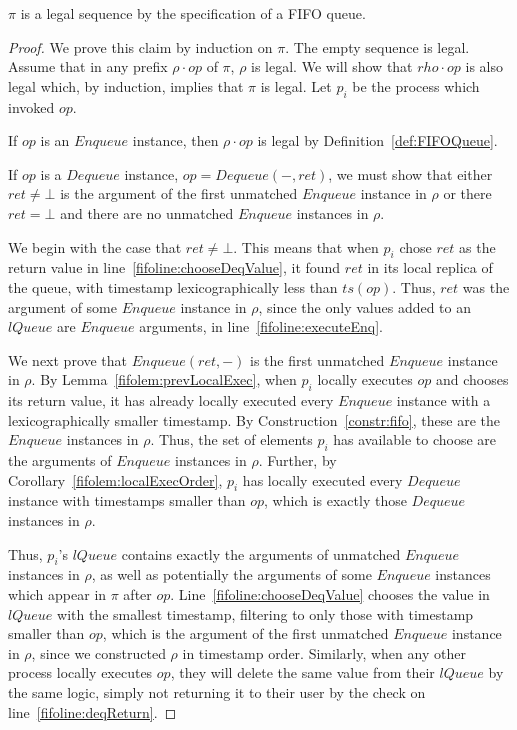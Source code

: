 \documentclass[a4paper,anonymous,USenglish]{lipics-v2021} %
\theoremstyle{definition}
\begin{document}
\begin{lemma}\label{fifolem:legal}
  $\pi$ is a legal sequence by the specification of a FIFO queue.
\end{lemma}

\begin{proof}
  We prove this claim by induction on $\pi$.  The empty sequence is legal.  Assume that in any prefix $\rho \cdot op$ of $\pi$, $\rho$ is legal.  We will show that $rho \cdot op$ is also legal which, by induction, implies that $\pi$ is legal.  Let $p_i$ be the process which invoked $op$.

  If $op$ is an $Enqueue$ instance, then $\rho \cdot op$ is legal by Definition~\ref{def:FIFOQueue}.

  If $op$ is a $Dequeue$ instance, $op = Dequeue(-,ret)$, we must show that either $ret \neq \bot$ is the argument of the first unmatched $Enqueue$ instance in $\rho$ or there $ret = \bot$ and there are no unmatched $Enqueue$ instances in $\rho$.

  We begin with the case that $ret \neq \bot$.  This means that when $p_i$ chose $ret$ as the return value in line~\ref{fifoline:chooseDeqValue}, it found $ret$ in its local replica of the queue, with timestamp lexicographically less than $ts(op)$.  Thus, $ret$ was the argument of some $Enqueue$ instance in $\rho$, since the only values added to an $lQueue$ are $Enqueue$ arguments, in line~\ref{fifoline:executeEnq}.

  We next prove that $Enqueue(ret,-)$ is the first unmatched $Enqueue$ instance in $\rho$.  By Lemma~\ref{fifolem:prevLocalExec}, when $p_i$ locally executes $op$ and chooses its return value, it has already locally executed every $Enqueue$ instance with a lexicographically smaller timestamp.  By Construction~\ref{constr:fifo}, these are the $Enqueue$ instances in $\rho$.  Thus, the set of elements $p_i$ has available to choose are the arguments of $Enqueue$ instances in $\rho$.  Further, by Corollary~\ref{fifolem:localExecOrder}, $p_i$ has locally executed every $Dequeue$ instance with timestamps smaller than $op$, which is exactly those $Dequeue$ instances in $\rho$.

  Thus, $p_i$'s $lQueue$ contains exactly the arguments of unmatched $Enqueue$ instances in $\rho$, as well as potentially the arguments of some $Enqueue$ instances which appear in $\pi$ after $op$.  Line~\ref{fifoline:chooseDeqValue} chooses the value in $lQueue$ with the smallest timestamp, filtering to only those with timestamp smaller than $op$, which is the argument of the first unmatched $Enqueue$ instance in $\rho$, since we constructed $\rho$ in timestamp order.  Similarly, when any other process locally executes $op$, they will delete the same value from their $lQueue$ by the same logic, simply not returning it to their user by the check on line~\ref{fifoline:deqReturn}.  


\end{proof}
\end{document}
